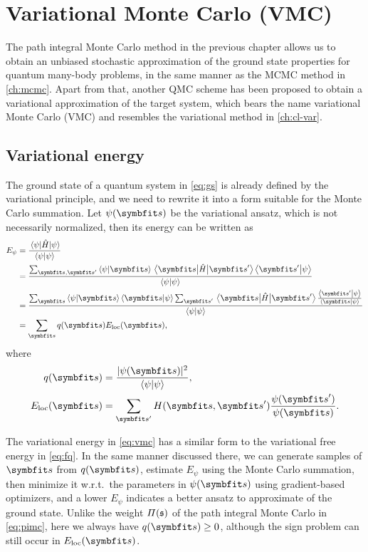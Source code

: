 \chapter{Variational Monte Carlo (VMC)}

The path integral Monte Carlo method in the previous chapter allows us to obtain an unbiased stochastic approximation of the ground state properties for quantum many-body problems, in the same manner as the MCMC method in \cref{ch:mcmc}. Apart from that, another QMC scheme has been proposed to obtain a variational approximation of the target system, which bears the name variational Monte Carlo (VMC) and resembles the variational method in \cref{ch:cl-var}.

\section{Variational energy}

The ground state of a quantum system in \cref{eq:gs} is already defined by the variational principle, and we need to rewrite it into a form suitable for the Monte Carlo summation. Let $\psi(\vs)$ be the variational ansatz, which is not necessarily normalized, then its energy can be written as
\begin{align}
E_\psi &= \frac{\ev{\hat{H}}{\psi}}{\ip{\psi}} \\
&= \frac
{\sum_{\vs, \vs'} \ip{\psi}{\vs} \mel{\vs}{\hat{H}}{\vs'} \ip{\vs'}{\psi}}
{\ip{\psi}} \\
&= \frac
{\sum_\vs \ip{\psi}{\vs} \ip{\vs}{\psi} \sum_{\vs'} \mel{\vs}{\hat{H}}{\vs'} \frac{\ip{\vs'}{\psi}}{\ip{\vs}{\psi}}}
{\ip{\psi}} \\
&= \sum_\vs q(\vs) E_\text{loc}(\vs), \label{eq:vmc}
\end{align}
where
\begin{align}
q(\vs) &= \frac{|\psi(\vs)|^2}{\ip{\psi}}, \\
E_\text{loc}(\vs) &= \sum_{\vs'} H(\vs, \vs') \frac{\psi(\vs')}{\psi(\vs)}.
\end{align}

The variational energy in \cref{eq:vmc} has a similar form to the variational free energy in \cref{eq:fq}. In the same manner discussed there, we can generate samples of $\vs$ from $q(\vs)$, estimate $E_\psi$ using the Monte Carlo summation, then minimize it w.r.t.\ the parameters in $\psi(\vs)$ using gradient-based optimizers, and a lower $E_\psi$ indicates a better ansatz to approximate of the ground state. Unlike the weight $\varPi(\mathfrak{s})$ of the path integral Monte Carlo in \cref{eq:pimc}, here we always have $q(\vs) \ge 0$, although the sign problem can still occur in $E_\text{loc}(\vs)$.

